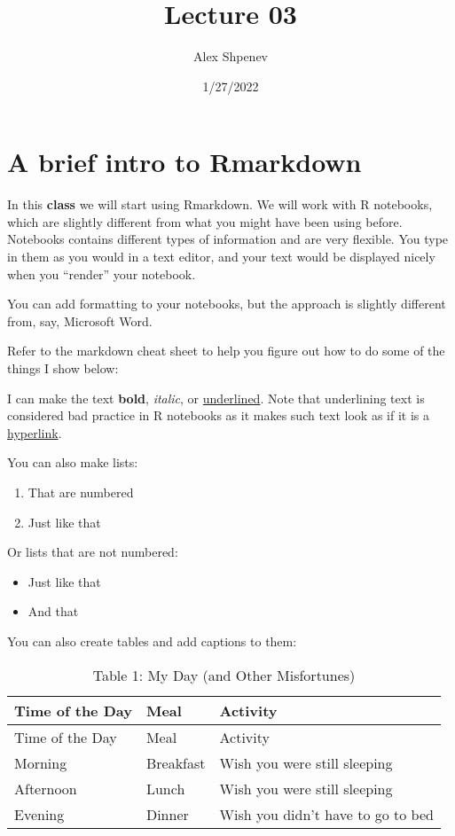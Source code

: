 \documentclass[
]{article}
\title{Lecture 03}
\author{Alex Shpenev}
\date{1/27/2022}
\begin{document}
\maketitle

\hypertarget{a-brief-intro-to-rmarkdown}{%
\section{A brief intro to Rmarkdown}\label{a-brief-intro-to-rmarkdown}}

In this \textbf{class} we will start using Rmarkdown. We will work with
R notebooks, which are slightly different from what you might have been
using before. Notebooks contains different types of information and are
very flexible. You type in them as you would in a text editor, and your
text would be displayed nicely when you ``render'' your notebook.

You can add formatting to your notebooks, but the approach is slightly
different from, say, Microsoft Word.

Refer to the markdown cheat sheet to help you figure out how to do some
of the things I show below:

I can make the text \textbf{bold}, \emph{italic}, or
\underline{underlined}. Note that underlining text is considered bad
practice in R notebooks as it makes such text look as if it is a
\href{https://www.upenn.edu/}{hyperlink}.

You can also make lists:

\begin{enumerate}
\def\labelenumi{\arabic{enumi}.}
\item
  That are numbered
\item
  Just like that
\end{enumerate}

Or lists that are not numbered:

\begin{itemize}
\item
  Just like that
\item
  And that
\end{itemize}

You can also create tables and add captions to them:

\begin{longtable}[]{@{}lll@{}}
\caption{Table 1: My Day (and Other Misfortunes)}\tabularnewline
\toprule
Time of the Day & Meal & Activity \\
\midrule
\endfirsthead
\toprule
Time of the Day & Meal & Activity \\
\midrule
\endhead
Morning & Breakfast & Wish you were still sleeping \\
Afternoon & Lunch & Wish you were still sleeping \\
Evening & Dinner & Wish you didn't have to go to bed \\
\bottomrule
\end{longtable}
\end{document}

